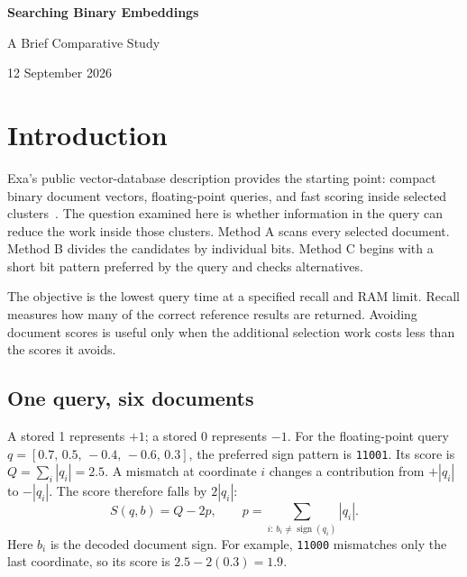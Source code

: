 \documentclass[11pt,a4paper]{article}
\begin{document}
{\Large\bfseries\color{Ink} Searching Binary Embeddings}\par
{\large A Brief Comparative Study}\par
{\small 12 September 2026}\par

\begin{abstract}
This study compares three methods for searching binary document embeddings: scanning selected
clusters, splitting candidates with bitplanes, and looking up short bit patterns in increasing
mismatch cost. Each method uses the same score and is evaluated under a recall requirement and
memory limit. On one million real passage embeddings, neither alternative established a speed
advantage over the tuned scan. Constructed inputs show a small key-lookup advantage when the
important coordinates remain fixed and a large bitplane advantage when they change by query.
The cost analysis explains these outcomes and the limits of extrapolating them to larger collections.
\end{abstract}

\section{Introduction}
Exa's public vector-database description provides the starting point: compact binary document
vectors, floating-point queries, and fast scoring inside selected clusters~\cite{exa}. The
question examined here is whether information in the query can reduce the work inside those
clusters. Method A scans every selected document. Method B divides the candidates by individual
bits. Method C begins with a short bit pattern preferred by the query and checks alternatives.

The objective is the lowest query time at a specified recall and RAM limit. Recall measures
how many of the correct reference results are returned. Avoiding document scores is useful only
when the additional selection work costs less than the scores it avoids.

\subsection{One query, six documents}
A stored 1 represents $+1$; a stored 0 represents $-1$. For the floating-point query
$q=[0.7,\,0.5,\,-0.4,\,-0.6,\,0.3]$, the preferred sign pattern is \texttt{11001}.
Its score is $Q=\sum_i|q_i|=2.5$. A mismatch at coordinate $i$ changes a contribution from
$+|q_i|$ to $-|q_i|$. The score therefore falls by $2|q_i|$:
\begin{equation}
 S(q,b)=Q-2p,\qquad p=\sum_{i:\,b_i\ne\operatorname{sign}(q_i)}|q_i|.
 \label{eq:score}
\end{equation}
Here $b_i$ is the decoded document sign. For example, \texttt{11000} mismatches only the last
coordinate, so its score is $2.5-2(0.3)=1.9$.
\end{document}
